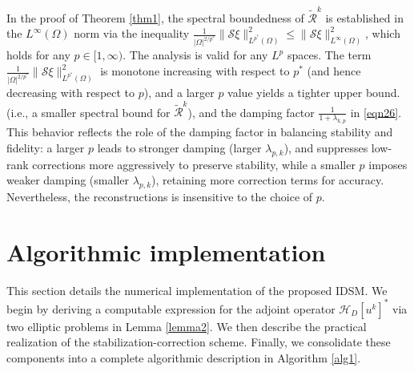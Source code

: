 \documentclass[onefignum,onetabnum]{siamart190516}
\numberwithin{equation}{section}
\begin{document}
In the proof of Theorem \ref{thm1}, the spectral boundedness of $\widetilde{\mathcal{R}}^k$ is established in the $L^{\infty}(\Omega)$ norm via the inequality $\frac{1}{|\Omega|^{2/p^{*}}}\|\mathcal{S}\xi\|_{L^{p^{*}}(\Omega)}^{2} \leq \|\mathcal{S}\xi\|_{L^{\infty}(\Omega)}^{2}$, which holds for any $p \in [1, \infty)$.
The analysis is valid for any $L^p$ spaces.
The term $\frac{1}{|\Omega|^{2/p^{*}}}\|\mathcal{S}\xi\|_{L^{p^{*}}(\Omega)}^{2}$ is monotone increasing with respect to $p^{*}$ (and hence decreasing with respect to $p$), and a larger $p$ value yields a tighter upper bound.
(i.e., a smaller spectral bound for $\widetilde{\mathcal{R}}^k$), and the damping factor $\frac{1}{1+\lambda_{k,p}}$ in \eqref{eqn26}.
This behavior reflects the role of the damping factor in balancing stability and fidelity: a larger $p$ leads to stronger damping (larger $\lambda_{p,k}$), and suppresses low-rank corrections more aggressively to preserve stability, while a smaller $p$ imposes weaker damping (smaller $\lambda_{p,k}$), retaining more correction terms for accuracy.
Nevertheless, the reconstructions is insensitive to the choice of $p$.

\section{Algorithmic implementation}\label{sec:IMP}
This section details the numerical implementation of the proposed IDSM.
We begin by deriving a computable expression for the adjoint operator $\mathcal{H}_D[u^k]^*$ via two elliptic problems in Lemma \ref{lemma2}.
We then describe the practical realization of the stabilization-correction scheme.
Finally, we consolidate these components into a complete algorithmic description in Algorithm \ref{alg1}.
\end{document}
